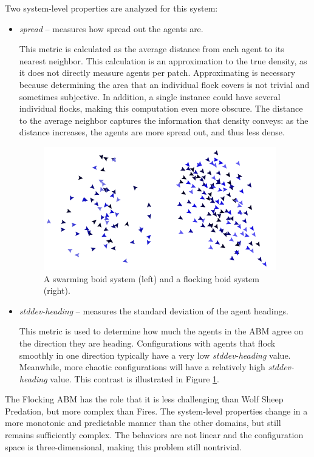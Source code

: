 Two system-level properties are analyzed for this system:
\begin{itemize}
\item \textit{spread} -- measures how spread out the agents are.

This metric is calculated as the average distance from each agent to its nearest neighbor.
This calculation is an approximation to the true density, as it does not directly measure agents per patch.
Approximating is necessary because determining the area that an individual flock covers is not trivial and sometimes subjective.
In addition, a single instance could have several individual flocks, making this computation even more obscure.
The distance to the average neighbor captures the information that density conveys: as the distance increases, the agents are more spread out, and thus less dense.

\begin{figure}[ht]
\centering
\includegraphics[scale=1]{images/swarmVSflock.png}
\caption{A swarming boid system (left) and a flocking boid system (right).}
\label{fig:swarmVSflock}
\end{figure}

\item \textit{stddev-heading} -- measures the standard deviation of the agent headings.

This metric is used to determine how much the agents in the ABM agree on the direction they are heading.
Configurations with agents that flock smoothly in one direction typically have a very low \textit{stddev-heading} value.
Meanwhile, more chaotic configurations will have a relatively high \textit{stddev-heading} value.
This contrast is illustrated in Figure \ref{fig:swarmVSflock}.

\end{itemize}

The Flocking ABM has the role that it is less challenging than Wolf Sheep Predation, but more complex than Fires.
The system-level properties change in a more monotonic and predictable manner than the other domains, but still remains sufficiently complex.
The behaviors are not linear and the configuration space is three-dimensional, making this problem still nontrivial. 

